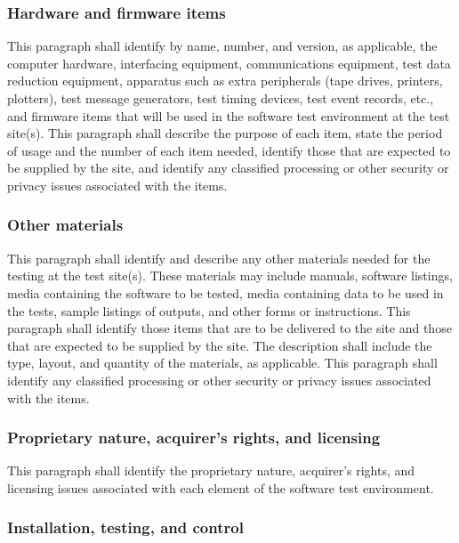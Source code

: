 \documentclass{fidata-report-template}
\begin{document}
\subsubsection{Hardware and firmware items}

This paragraph shall identify by name, number, and version, as
applicable, the computer hardware, interfacing equipment, communications
equipment, test data reduction equipment, apparatus such as extra
peripherals (tape drives, printers, plotters), test message generators,
test timing devices, test event records, etc., and firmware items that
will be used in the software test environment at the test site(s). This
paragraph shall describe the purpose of each item, state the period of
usage and the number of each item needed, identify those that are
expected to be supplied by the site, and identify any classified
processing or other security or privacy issues associated with the
items.

\subsubsection{Other materials}

This paragraph shall identify and describe any other materials needed
for the testing at the test site(s). These materials may include
manuals, software listings, media containing the software to be tested,
media containing data to be used in the tests, sample listings of
outputs, and other forms or instructions. This paragraph shall identify
those items that are to be delivered to the site and those that are
expected to be supplied by the site. The description shall include the
type, layout, and quantity of the materials, as applicable. This
paragraph shall identify any classified processing or other security or
privacy issues associated with the items.

\subsubsection{Proprietary nature, acquirer's rights, and
licensing}

This paragraph shall identify the proprietary nature, acquirer's rights,
and licensing issues associated with each element of the software test
environment.

\subsubsection{Installation, testing, and control}
\end{document}
